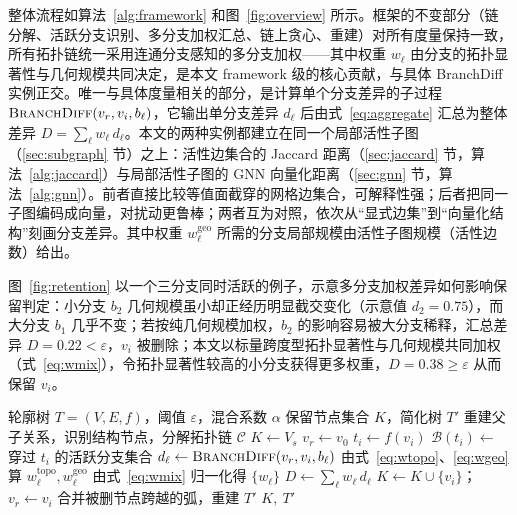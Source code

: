 \documentclass[twocolumn, a4paper, 10pt]{article}
\begin{document}
整体流程如算法~\ref{alg:framework} 和图~\ref{fig:overview} 所示。框架的不变部分（链分解、活跃分支识别、多分支加权汇总、链上贪心、重建）对所有度量保持一致，所有拓扑链统一采用连通分支感知的多分支加权——其中权重 $w_\ell$ 由分支的拓扑显著性与几何规模共同决定，是本文 framework 级的核心贡献，与具体 BranchDiff 实例正交。唯一与具体度量相关的部分，是计算单个分支差异的子过程 $\textsc{BranchDiff}(v_r,v_i,b_\ell)$，它输出单分支差异 $d_\ell$ 后由式~\eqref{eq:aggregate} 汇总为整体差异 $D=\sum_\ell w_\ell\, d_\ell$。本文的两种实例都建立在同一个局部活性子图（\ref{sec:subgraph} 节）之上：活性边集合的 Jaccard 距离（\ref{sec:jaccard} 节，算法~\ref{alg:jaccard}）与局部活性子图的 GNN 向量化距离（\ref{sec:gnn} 节，算法~\ref{alg:gnn}）。前者直接比较等值面截穿的网格边集合，可解释性强；后者把同一子图编码成向量，对扰动更鲁棒；两者互为对照，依次从“显式边集”到“向量化结构”刻画分支差异。其中权重 $w^{\mathrm{geo}}_\ell$ 所需的分支局部规模由活性子图规模（活性边数）给出。

图~\ref{fig:retention} 以一个三分支同时活跃的例子，示意多分支加权差异如何影响保留判定：小分支 $b_2$ 几何规模虽小却正经历明显截交变化（示意值 $d_2=0.75$），而大分支 $b_1$ 几乎不变；若按纯几何规模加权，$b_2$ 的影响容易被大分支稀释，汇总差异 $D=0.22<\varepsilon$，$v_i$ 被删除；本文以标量跨度型拓扑显著性与几何规模共同加权（式~\eqref{eq:wmix}），令拓扑显著性较高的小分支获得更多权重，$D=0.38\geq\varepsilon$ 从而保留 $v_i$。

\begin{algorithm}[H]
\caption{连通分支感知的多分支加权简化（总体框架）}
\label{alg:framework}
\begin{algorithmic}[1]
\Require 轮廓树 $T=(V,E,f)$，阈值 $\varepsilon$，混合系数 $\alpha$
\Ensure 保留节点集合 $K$，简化树 $T'$
\State 重建父子关系，识别结构节点，分解拓扑链 $\mathcal{C}$
\State $K \gets V_s$ 
  \State $v_r \gets v_0$
    \State $t_i \gets f(v_i)$
    \State $\mathcal{B}(t_i) \gets$ 穿过 $t_i$ 的活跃分支集合
      \State $d_\ell \gets \textsc{BranchDiff}(v_r,v_i,b_\ell)$ 
      \State 由式~\eqref{eq:wtopo}、\eqref{eq:wgeo} 算 $w^{\mathrm{topo}}_\ell,w^{\mathrm{geo}}_\ell$
    \EndFor
    \State 由式~\eqref{eq:wmix} 归一化得 $\{w_\ell\}$
    \State $D \gets \sum_\ell w_\ell\, d_\ell$
      \State $K \gets K \cup \{v_i\}$；\quad $v_r \gets v_i$
    \EndIf
  \EndFor
\EndFor
\State 合并被删节点跨越的弧，重建 $T'$
\State \Return $K,\ T'$
\end{algorithmic}
\end{algorithm}
\end{document}
